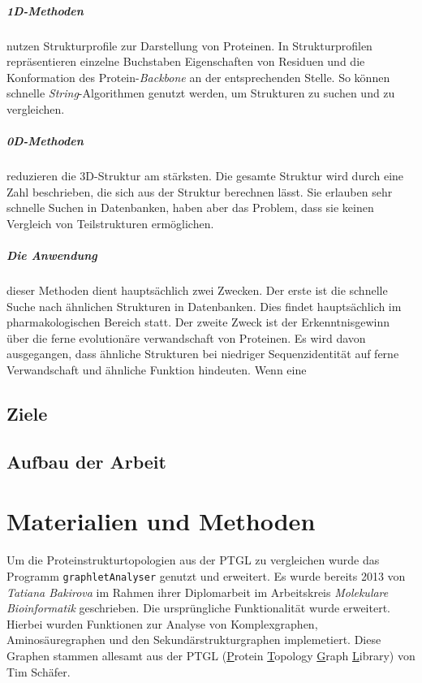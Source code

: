 \documentclass{report}
\begin{document}
\paragraph{1D-Methoden} nutzen Strukturprofile zur Darstellung von Proteinen. In Strukturprofilen repr\"asentieren einzelne Buchstaben Eigenschaften von Residuen und die Konformation des Protein-\textit{Backbone} an der entsprechenden Stelle. So k\"onnen schnelle \textit{String}-Algorithmen genutzt werden, um Strukturen zu suchen und zu vergleichen.

\paragraph{0D-Methoden} reduzieren die 3D-Struktur am st\"arksten. Die gesamte Struktur wird durch eine Zahl beschrieben, die sich aus der Struktur berechnen l\"asst. Sie erlauben sehr schnelle Suchen in Datenbanken, haben aber das Problem, dass sie keinen Vergleich von Teilstrukturen erm\"oglichen.

\paragraph{Die Anwendung} dieser Methoden dient haupts\"achlich zwei Zwecken. Der erste ist die schnelle Suche nach \"ahnlichen Strukturen in Datenbanken. Dies findet haupts\"achlich im pharmakologischen Bereich statt.
Der zweite Zweck ist der Erkenntnisgewinn \"uber die ferne evolution\"are verwandschaft von Proteinen. Es wird davon ausgegangen, dass \"ahnliche Strukturen bei niedriger Sequenzidentit\"at auf ferne Verwandschaft und \"ahnliche Funktion hindeuten. Wenn eine


\section{Ziele}

\section{Aufbau der Arbeit}

\chapter{Materialien und Methoden}

Um die Proteinstrukturtopologien aus der PTGL zu vergleichen wurde das Programm \texttt{graphletAnalyser} genutzt und erweitert. Es wurde bereits 2013 von \textit{Tatiana Bakirova} im Rahmen ihrer Diplomarbeit im Arbeitskreis \textit{Molekulare Bioinformatik} geschrieben. Die urspr\"ungliche Funktionalität wurde erweitert. Hierbei wurden Funktionen zur Analyse von Komplexgraphen, Aminos\"auregraphen und den Sekund\"arstrukturgraphen implemetiert. Diese Graphen stammen allesamt aus der PTGL (\underline{P}rotein \underline{T}opology \underline{G}raph \underline{L}ibrary) von Tim Sch\"afer.
\end{document}
